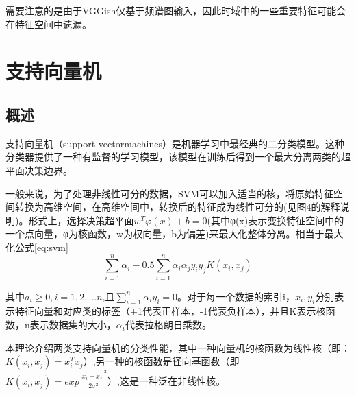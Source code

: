 需要注意的是由于VGGish仅基于频谱图输入，因此时域中的一些重要特征可能会在特征空间中遗漏。

\section{支持向量机}
\subsection{概述}
支持向量机（support vectormachines）是机器学习中最经典的二分类模型。这种分类器提供了一种有监督的学习模型，该模型在训练后得到一个最大分离两类的超平面决策边界。

一般来说，为了处理非线性可分的数据，SVM可以加入适当的核，将原始特征空间转换为高维空间，在高维空间中，转换后的特征成为线性可分的(见图4的解释说明)。形式上，选择决策超平面\(w^Tφ(x) + b = 0\)(其中φ(x)表示变换特征空间中的一个点向量，φ为核函数，w为权向量，b为偏差)来最大化整体分离。相当于最大化公式\ref{eq:svm}
\begin{equation}
    \label{eq:svm}
    \sum_{i=1}^n \alpha_i -0.5\sum_{i=1}^n \alpha_i \alpha_j y_i y_j K(x_i,x_j)
\end{equation}

其中\(a_i \ge 0,i=1,2,...n\),且\(\sum_{i=1}^n\alpha_i y_i=0\)。对于每一个数据的索引i，\(x_i,y_i\)分别表示特征向量和对应类的标签（+1代表正样本，-1代表负样本），并且K表示核函数，n表示数据集的大小，\(\alpha_i\)代表拉格朗日乘数。

本理论介绍两类支持向量机的分类性能，其中一种向量机的核函数为线性核（即：\(K(x_i, x_j) = x_i^T x_j\)）,另一种的核函数是径向基函数（即\(K(x_i,x_j) = exp \frac{|x_i-x_j|^2}{2σ^2}）\),这是一种泛在非线性核。

